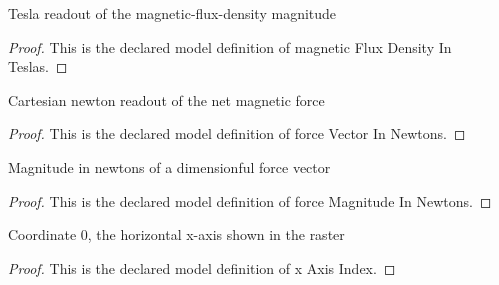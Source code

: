 \begin{definition}
  \label{def:physics:phyx-mini-0950:phyxminiproblems-problemphyxmini0950-magneticfluxdensityinteslas}
  Tesla readout of the magnetic-flux-density magnitude
\end{definition}
\begin{proof}
  This is the declared model definition of magnetic Flux Density In Teslas.
\end{proof}
\begin{definition}
  \label{def:physics:phyx-mini-0950:phyxminiproblems-problemphyxmini0950-forcevectorinnewtons}
  Cartesian newton readout of the net magnetic force
\end{definition}
\begin{proof}
  This is the declared model definition of force Vector In Newtons.
\end{proof}
\begin{definition}
  \label{def:physics:phyx-mini-0950:phyxminiproblems-problemphyxmini0950-forcemagnitudeinnewtons}
  Magnitude in newtons of a dimensionful force vector
\end{definition}
\begin{proof}
  This is the declared model definition of force Magnitude In Newtons.
\end{proof}
\begin{definition}
  \label{def:physics:phyx-mini-0950:phyxminiproblems-problemphyxmini0950-xaxisindex}
  Coordinate 0, the horizontal x-axis shown in the raster
\end{definition}
\begin{proof}
  This is the declared model definition of x Axis Index.
\end{proof}
